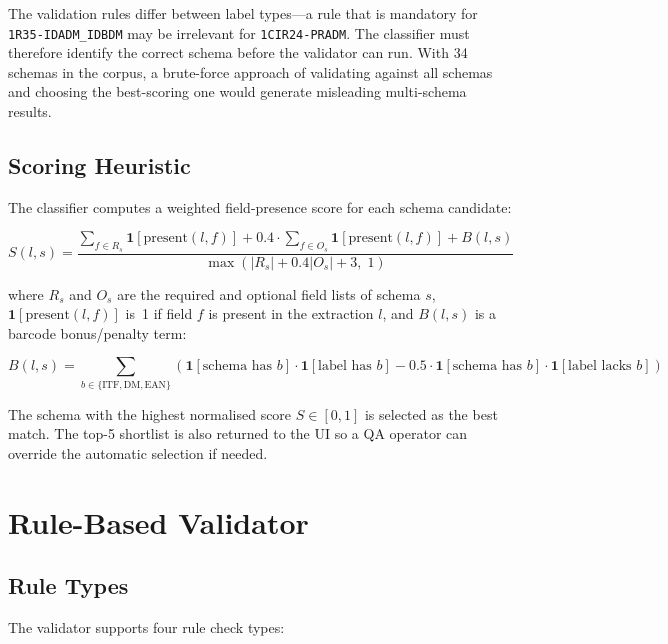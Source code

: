 The validation rules differ between label types—a rule that is mandatory for \texttt{1R35-IDADM\_IDBDM}
may be irrelevant for \texttt{1CIR24-PRADM}. The classifier must therefore identify the
correct schema before the validator can run. With 34 schemas in the corpus, a brute-force
approach of validating against all schemas and choosing the best-scoring one would generate
misleading multi-schema results.

\subsection{Scoring Heuristic}

The classifier computes a weighted field-presence score for each schema candidate:

\begin{equation}
S(l, s) = \frac{\displaystyle\sum_{f \in R_s} \mathbf{1}[\text{present}(l, f)]
              + 0.4 \cdot \sum_{f \in O_s} \mathbf{1}[\text{present}(l, f)]
              + B(l, s)}
           {\max(|R_s| + 0.4|O_s| + 3,\; 1)}
\label{eq:type_score}
\end{equation}

where $R_s$ and $O_s$ are the required and optional field lists of schema $s$,
$\mathbf{1}[\text{present}(l, f)]$ is~1 if field $f$ is present in the extraction $l$,
and $B(l, s)$ is a barcode bonus/penalty term:

\begin{equation}
B(l, s) = \sum_{b \in \{\text{ITF}, \text{DM}, \text{EAN}\}} \left(
  \mathbf{1}[\text{schema has } b] \cdot \mathbf{1}[\text{label has } b]
  - 0.5 \cdot \mathbf{1}[\text{schema has } b] \cdot \mathbf{1}[\text{label lacks } b]
\right)
\label{eq:barcode_bonus}
\end{equation}

The schema with the highest normalised score $S \in [0, 1]$ is selected as the best match.
The top-5 shortlist is also returned to the \ac{UI} so a QA operator can override the
automatic selection if needed.

\section{Rule-Based Validator}

\subsection{Rule Types}

The validator supports four rule check types:

